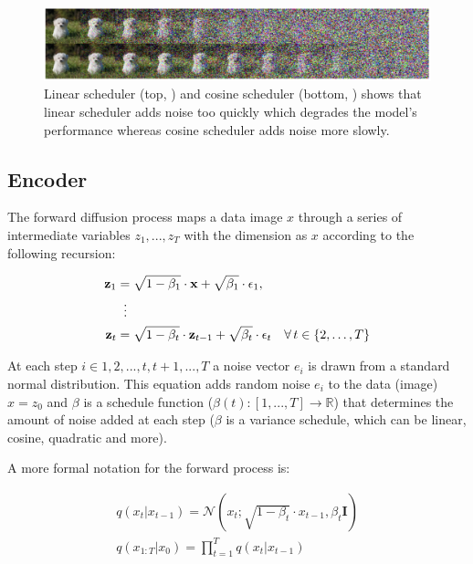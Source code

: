 \begin{figure}
    \centering
    \includegraphics[width=1\textwidth]{images/diffusion_models/linear_cosine_scheduler.png}
    \caption{Linear scheduler (top, \cite{ddpm}) and cosine scheduler (bottom, \cite{openai_improved_ddpm}) shows that linear scheduler adds noise too quickly which degrades the model's performance whereas cosine scheduler adds noise more slowly.}
    \label{fig:linear_cosine_scheduler}
\end{figure}







\subsection{Encoder}

The forward diffusion process maps a data image $x$ through a series of intermediate variables $z_1, ..., z_T$ with the dimension as $x$ according to the following recursion:

\begin{equation}
    \begin{aligned}
    \mathbf{z}_1 &= \sqrt{1 - \beta_1} \cdot \mathbf{x} + \sqrt{\beta_1} \cdot \epsilon_1, \\
    &\;\;\vdots \notag \\
    \mathbf{z}_t &= \sqrt{1 - \beta_t} \cdot \mathbf{z}_{t-1} + \sqrt{\beta_t} \cdot \epsilon_t \quad \forall \, t \in \{2, \ldots, T\}
    \end{aligned}
\end{equation}

At each step $i \in {1, 2, ..., t, t+1, ..., T}$ a noise vector $e_i$ is drawn from a standard normal distribution. This equation adds random noise $e_i$ to the data (image) $x = z_0$ and $\beta$ is a schedule function ($\beta(t):[1, ..., T] \rightarrow \mathbb{R}$) that determines the amount of noise added at each step ($\beta$ is a variance schedule, which can be linear, cosine, quadratic and more). 

A more formal notation for the forward process is:

\begin{equation*}
    \begin{aligned}
        q(x_t | x_{t-1}) = \mathcal{N}(x_t; \sqrt{1-\beta_t} \cdot x_{t-1}, \beta_t \mathbf{I}) \\
        q(x_{1:T} | x_0) = \prod_{t=1}^{T} q(x_t | x_{t-1})
    \end{aligned}
\end{equation*}

